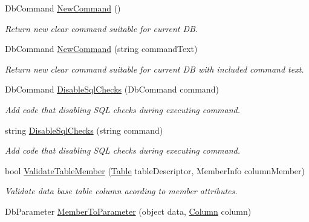 \begin{DoxyCompactItemize}
Db\+Command \mbox{\hyperlink{class_uniform_data_operator_1_1_sql_1_1_my_sql_1_1_my_sql_data_operator_af5850bfb38f7dfcd5acd5157458ef4bd}{New\+Command}} ()
\begin{DoxyCompactList}\small\item\em Return new clear command suitable for current DB. \end{DoxyCompactList}\item 
Db\+Command \mbox{\hyperlink{class_uniform_data_operator_1_1_sql_1_1_my_sql_1_1_my_sql_data_operator_a6c2e2d374072c275953a515379963881}{New\+Command}} (string command\+Text)
\begin{DoxyCompactList}\small\item\em Return new clear command suitable for current DB with included command text. \end{DoxyCompactList}\item 
Db\+Command \mbox{\hyperlink{class_uniform_data_operator_1_1_sql_1_1_my_sql_1_1_my_sql_data_operator_affbacb4fb1773fc14cdbb9cbcd315c5f}{Disable\+Sql\+Checks}} (Db\+Command command)
\begin{DoxyCompactList}\small\item\em Add code that disabling S\+QL checks during executing command. \end{DoxyCompactList}\item 
string \mbox{\hyperlink{class_uniform_data_operator_1_1_sql_1_1_my_sql_1_1_my_sql_data_operator_a3e80f9136c9fef46a443901a15f1e289}{Disable\+Sql\+Checks}} (string command)
\begin{DoxyCompactList}\small\item\em Add code that disabling S\+QL checks during executing command. \end{DoxyCompactList}\item 
bool \mbox{\hyperlink{class_uniform_data_operator_1_1_sql_1_1_my_sql_1_1_my_sql_data_operator_a233ab791c68b93aded97bfd9986767e8}{Validate\+Table\+Member}} (\mbox{\hyperlink{class_uniform_data_operator_1_1_sql_1_1_attributes_1_1_table}{Table}} table\+Descriptor, Member\+Info column\+Member)
\begin{DoxyCompactList}\small\item\em Validate data base table column acording to member attributes. \end{DoxyCompactList}\item 
Db\+Parameter \mbox{\hyperlink{class_uniform_data_operator_1_1_sql_1_1_my_sql_1_1_my_sql_data_operator_a7d10fc1dfc16ece78ad066f596523782}{Member\+To\+Parameter}} (object data, \mbox{\hyperlink{class_uniform_data_operator_1_1_sql_1_1_attributes_1_1_column}{Column}} column)

\end{DoxyCompactItemize}
